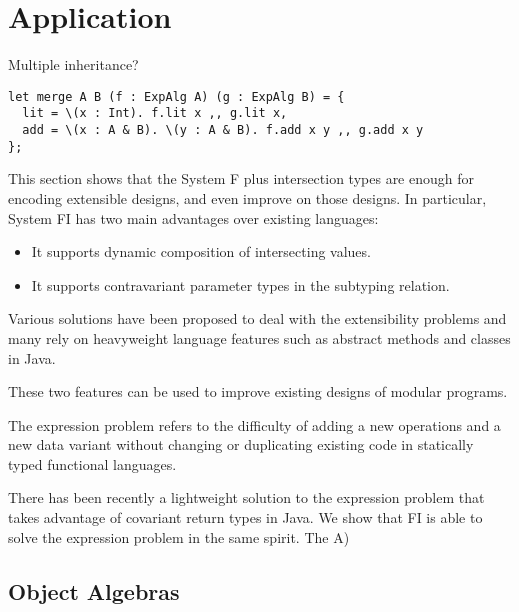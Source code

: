 \section{Application}

Multiple inheritance?



\begin{verbatim}
let merge A B (f : ExpAlg A) (g : ExpAlg B) = {
  lit = \(x : Int). f.lit x ,, g.lit x,
  add = \(x : A & B). \(y : A & B). f.add x y ,, g.add x y
};
\end{verbatim}

This section shows that the System F plus intersection types are enough for
encoding extensible designs, and even improve on those designs. In particular,
System FI has two main advantages over existing languages:

\begin{itemize}
\item It supports dynamic composition of intersecting values.
\item It supports contravariant parameter types in the subtyping relation.
\end{itemize}

Various solutions have been proposed to deal with the extensibility problems and
many rely on heavyweight language features such as abstract methods and classes
in Java.

These two features can be used to improve existing designs of modular programs.


The expression problem refers to the difficulty of adding a new operations and a
new data variant without changing or duplicating existing code in statically
typed functional languages.

There has been recently a lightweight solution to the expression problem that
takes advantage of covariant return types in Java. We show that FI is able to
solve the expression problem in the same spirit. The
A)

\subsection{Object Algebras}

